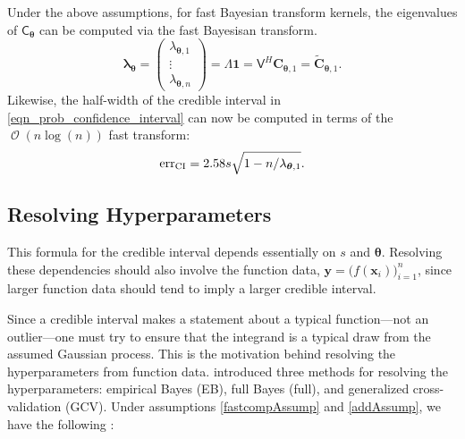 \documentclass[graybox,footinfo]{svmult}
\DeclareMathOperator{\Order}{{\mathcal O}}
\newcommand{\bm}[1]{\boldsymbol{#1}}
\newcommand{\vlambda}{{\bm{\lambda}}}
\newcommand{\vtheta}{{\bm{\theta}}}
\newcommand{\vC}{\bm{C}}
\newcommand{\vx}{\bm{x}}
\newcommand{\vy}{\bm{y}}
\newcommand{\vone}{\bm{1}}
\newcommand{\mC}{\mathsf{C}}
\newcommand{\mLambda}{\mathsf{\Lambda}}
\newcommand{\mV}{\mathsf{V}}
\newcommand{\CI}{\textup{CI}}
\newcommand{\err}{\textup{err}}
\begin{document}
Under the above assumptions, for fast Bayesian transform kernels, the eigenvalues of $\mC_\vtheta$ can be computed via the fast Bayesisan transform.
\begin{equation} 
	\vlambda_\vtheta
	= \begin{pmatrix}
		\lambda_{\vtheta,1} \\ \vdots \\ \lambda _{\vtheta,n}
	\end{pmatrix} = \mLambda \vone  
	= \mV^H \vC_{\vtheta,1} =  \widetilde{\vC}_{\vtheta,1}.
	\label{eqn:fast_transform_to_eigvalues}
\end{equation}
Likewise, the half-width of the credible interval in \eqref{eqn_prob_confidence_interval} can now be computed in terms of the $\Order(n \log(n))$ fast transform:
\begin{equation} \label{eqn:errcifast}
	\err_{\CI} = 2.58 s \sqrt{1 - n/\lambda_{\vtheta,1} }.
\end{equation}


\subsection{Resolving Hyperparameters} \label{sec:hyperparameters}

This formula for the credible interval depends essentially on $s$ and $\vtheta$.  Resolving these dependencies should also involve the function data,  $\vy = \bigl (f (\vx_i) \bigr)_{i=1}^n$, since larger function data should tend to imply a larger credible interval. 

Since a credible interval makes a statement about a typical function---not an outlier---one must try to ensure that the integrand is a typical draw from the assumed Gaussian process.  This is the motivation behind resolving the hyperparameters from function data. \cite{RatHic19a} introduced three methods for resolving the hyperparameters:  empirical Bayes (EB), full Bayes (full), and generalized cross-validation (GCV).  Under assumptions \eqref{fastcompAssump} and \eqref{addAssump}, we have the following \cite[Theorem 2]{RatHic19a}:
\end{document}
